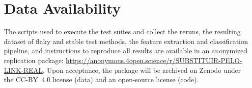 \documentclass[10pt,conference]{IEEEtran}
\begin{document}








\section*{Data Availability}
The scripts used to execute the test suites and collect the reruns, the
resulting dataset of flaky and stable test methods, the feature extraction
and classification pipeline, and instructions to reproduce all results are
available in an anonymized replication package:
\url{https://anonymous.4open.science/r/SUBSTITUIR-PELO-LINK-REAL}.
Upon acceptance, the package will be archived on Zenodo under the CC-BY~4.0
license (data) and an open-source license (code).



\end{document}
